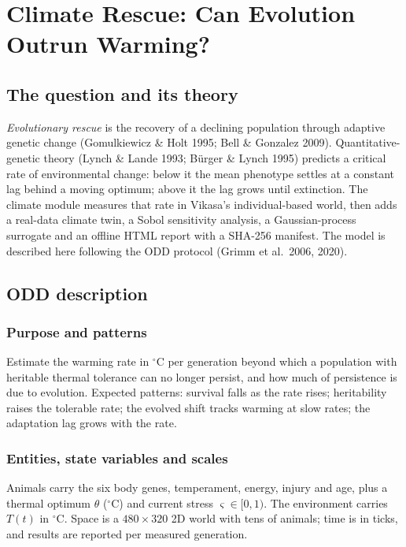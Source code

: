 \chapter{Climate Rescue: Can Evolution Outrun Warming?}
\label{ch:climate}


\section{The question and its theory}
\emph{Evolutionary rescue} is the recovery of a declining population through
adaptive genetic change (Gomulkiewicz \& Holt 1995; Bell \& Gonzalez 2009).
Quantitative-genetic theory (Lynch \& Lande 1993; B\"urger \& Lynch 1995) predicts
a critical rate of environmental change: below it the mean phenotype settles at a
constant lag behind a moving optimum; above it the lag grows until extinction. The
climate module measures that rate in Vikasa's individual-based world, then adds a
real-data climate twin, a Sobol sensitivity analysis, a Gaussian-process surrogate
and an offline HTML report with a SHA-256 manifest. The model is described here
following the ODD protocol (Grimm et al.\ 2006, 2020).

\section{ODD description}
\subsection{Purpose and patterns}
Estimate the warming rate in $^{\circ}$C per generation beyond which a population
with heritable thermal tolerance can no longer persist, and how much of persistence
is due to evolution. Expected patterns: survival falls as the rate rises;
heritability raises the tolerable rate; the evolved shift tracks warming at slow
rates; the adaptation lag grows with the rate.

\subsection{Entities, state variables and scales}
Animals carry the six body genes, temperament, energy, injury and age, plus a
thermal optimum $\theta$ ($^{\circ}$C) and current stress $\varsigma\in[0,1)$. The
environment carries $T(t)$ in $^{\circ}$C. Space is a $480\times320$ 2D world with
tens of animals; time is in ticks, and results are reported per measured generation.

